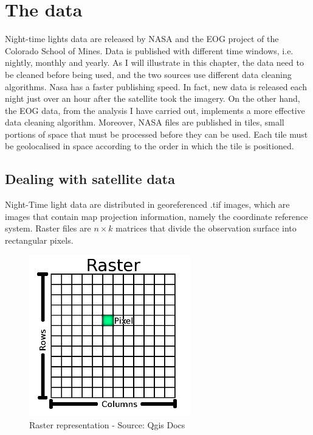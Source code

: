 \chapter{The data}\label{ch:mathtest} %
Night-time lights data are released by NASA and the EOG project of the Colorado School of Mines. Data is published with different time windows, i.e. nightly, monthly and yearly.
As I will illustrate in this chapter, the data need to be cleaned before being used, and the two sources use different data cleaning algorithms. Nasa has a faster publishing speed. In fact, new data is released each night just over an hour after the satellite took the imagery. On the other hand, the EOG data, from the analysis I have carried out, implements a more effective data cleaning algorithm. Moreover, NASA files are published in tiles, small portions of space that must be processed before they can be used. Each tile must be geolocalised in space according to the order in which the tile is positioned.

\section{Dealing with satellite data}

Night-Time light data are distributed in georeferenced .tif images, which are images that contain map projection information, namely the coordinate reference system. 
Raster files are  $n \times k$  matrices that divide the observation surface into rectangular pixels.

\begin{figure}[h]
    \begin{center}
    \includegraphics[width=7cm]{images/raster_dataset.png}
    \end{center}
    \caption{Raster representation - Source: Qgis Docs}
\end{figure}


